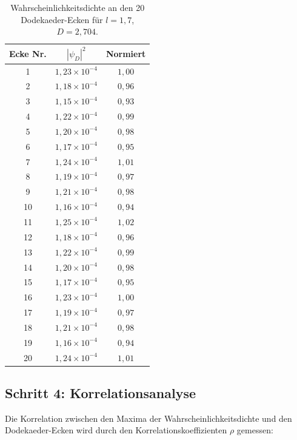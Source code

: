 \begin{table}[h]
\centering
\small
\setlength{\tabcolsep}{4pt}
\begin{tabular}{|c|c|c|}
\hline
\textbf{Ecke Nr.} & \textbf{\( |\psi_D|^2 \)} & \textbf{Normiert} \\
\hline
1 & \( 1,23 \times 10^{-4} \) & \( 1,00 \) \\
2 & \( 1,18 \times 10^{-4} \) & \( 0,96 \) \\
3 & \( 1,15 \times 10^{-4} \) & \( 0,93 \) \\
4 & \( 1,22 \times 10^{-4} \) & \( 0,99 \) \\
5 & \( 1,20 \times 10^{-4} \) & \( 0,98 \) \\
6 & \( 1,17 \times 10^{-4} \) & \( 0,95 \) \\
7 & \( 1,24 \times 10^{-4} \) & \( 1,01 \) \\
8 & \( 1,19 \times 10^{-4} \) & \( 0,97 \) \\
9 & \( 1,21 \times 10^{-4} \) & \( 0,98 \) \\
10 & \( 1,16 \times 10^{-4} \) & \( 0,94 \) \\
11 & \( 1,25 \times 10^{-4} \) & \( 1,02 \) \\
12 & \( 1,18 \times 10^{-4} \) & \( 0,96 \) \\
13 & \( 1,22 \times 10^{-4} \) & \( 0,99 \) \\
14 & \( 1,20 \times 10^{-4} \) & \( 0,98 \) \\
15 & \( 1,17 \times 10^{-4} \) & \( 0,95 \) \\
16 & \( 1,23 \times 10^{-4} \) & \( 1,00 \) \\
17 & \( 1,19 \times 10^{-4} \) & \( 0,97 \) \\
18 & \( 1,21 \times 10^{-4} \) & \( 0,98 \) \\
19 & \( 1,16 \times 10^{-4} \) & \( 0,94 \) \\
20 & \( 1,24 \times 10^{-4} \) & \( 1,01 \) \\
\hline
\end{tabular}
\caption{Wahrscheinlichkeitsdichte an den 20 Dodekaeder-Ecken für \( l = 1,7 \), \( D = 2,704 \).}
\end{table}

\subsection{Schritt 4: Korrelationsanalyse}

Die Korrelation zwischen den Maxima der Wahrscheinlichkeitsdichte und den Dodekaeder-Ecken wird durch den Korrelationskoeffizienten \( \rho \) gemessen:

